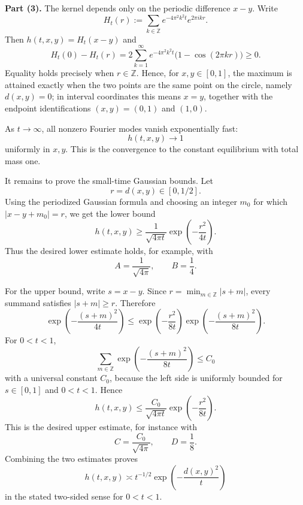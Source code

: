 \begin{solution}
\textbf{Part (3).}
The kernel depends only on the periodic difference $x-y$.  Write
\[
H_t(r):=\sum_{k\in\mathbb{Z}}e^{-4\pi^2k^2t}e^{2\pi ikr}.
\]
Then $h(t,x,y)=H_t(x-y)$ and
\[
H_t(0)-H_t(r)
=2\sum_{k=1}^{\infty}e^{-4\pi^2k^2t}\bigl(1-\cos(2\pi kr)\bigr)\geq 0.
\]
Equality holds precisely when $r\in\mathbb{Z}$.  Hence, for $x,y\in[0,1]$, the maximum is attained exactly when the two points are the same point on the circle, namely $d(x,y)=0$; in interval coordinates this means $x=y$, together with the endpoint identifications $(x,y)=(0,1)$ and $(1,0)$.

As $t\to\infty$, all nonzero Fourier modes vanish exponentially fast:
\[
h(t,x,y)\longrightarrow 1
\]
uniformly in $x,y$.  This is the convergence to the constant equilibrium with total mass one.

It remains to prove the small-time Gaussian bounds.  Let
\[
r=d(x,y)\in[0,1/2].
\]
Using the periodized Gaussian formula and choosing an integer $m_0$ for which $|x-y+m_0|=r$, we get the lower bound
\[
h(t,x,y)\geq \frac{1}{\sqrt{4\pi t}}\exp\left(-\frac{r^2}{4t}\right).
\]
Thus the desired lower estimate holds, for example, with
\[
A=\frac{1}{\sqrt{4\pi}},
\qquad
B=\frac14.
\]

For the upper bound, write $s=x-y$.  Since $r=\min_{m\in\mathbb{Z}}|s+m|$, every summand satisfies $|s+m|\geq r$.  Therefore
\[
\exp\left(-\frac{(s+m)^2}{4t}\right)
\leq
\exp\left(-\frac{r^2}{8t}\right)
\exp\left(-\frac{(s+m)^2}{8t}\right).
\]
For $0<t<1$,
\[
\sum_{m\in\mathbb{Z}}\exp\left(-\frac{(s+m)^2}{8t}\right)
\leq C_0
\]
with a universal constant $C_0$, because the left side is uniformly bounded for $s\in[0,1]$ and $0<t<1$.  Hence
\[
h(t,x,y)
\leq \frac{C_0}{\sqrt{4\pi t}}
\exp\left(-\frac{r^2}{8t}\right).
\]
This is the desired upper estimate, for instance with
\[
C=\frac{C_0}{\sqrt{4\pi}},
\qquad
D=\frac18.
\]
Combining the two estimates proves
\[
h(t,x,y)\asymp t^{-1/2}\exp\left(-\frac{d(x,y)^2}{t}\right)
\]
in the stated two-sided sense for $0<t<1$.
\end{solution}
